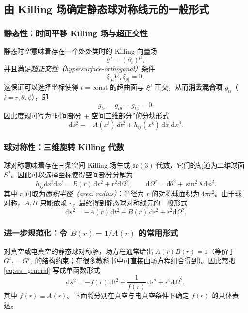 \documentclass[a4paper,12pt]{article}
\begin{document}
\subsection{由 Killing 场确定静态球对称线元的一般形式}

\subsubsection{静态性：时间平移 Killing 场与超正交性}
静态时空意味着存在一个处处类时的 Killing 向量场
\begin{equation}
\xi^\mu = (\partial_t)^\mu,
\end{equation}
并且满足\emph{超正交性（hypersurface-orthogonal）}条件
\begin{equation}
\xi_{[\mu}\nabla_{\nu}\xi_{\rho]}=0,
\end{equation}
这保证可以选择坐标使得 $t=\text{const}$ 的超曲面与 $\xi^\mu$ 正交，从而\textbf{消去混合项} $g_{ti}$（$i=r,\theta,\phi$），即
\begin{equation}
g_{tr}=g_{t\theta}=g_{t\phi}=0.
\end{equation}
因此度规可写为“时间部分 + 空间三维部分”的分块形式
\begin{equation}
\mathrm{d}s^2=-A(x^i)\,dt^2+h_{ij}(x^k)\,\mathrm{d}x^i \mathrm{d}x^j.
\end{equation}

\subsubsection{球对称性：三维旋转 Killing 代数}
球对称意味着存在三条空间 Killing 场生成 $\mathfrak{so}(3)$ 代数，它们的轨道为二维球面 $S^2$。因此可以选择坐标使得空间部分分解为
\begin{equation}
h_{ij}\mathrm{d}x^i \mathrm{d}x^j=B(r)\,\mathrm{d}r^2+r^2 \mathrm{d}\Omega^2,
\qquad
\mathrm{d}\Omega^2=\mathrm{d}\theta^2+\sin^2\theta\,\mathrm{d}\phi^2.
\end{equation}
其中 $r$ 可取为\emph{面积半径（areal radius）}：半径为 $r$ 的对称球面积为 $4\pi r^2$。由于球对称，$A,B$ 只能依赖 $r$，最终得到静态球对称线元的一般形式
\begin{equation}
\boxed{
\mathrm{d}s^2=-A(r)\,\mathrm{d}t^2+B(r)\,\mathrm{d}r^2+r^2 \mathrm{d}\Omega^2.
}
\label{eq:sss_general}
\end{equation}

\subsubsection{进一步规范化：令 $B(r)=1/A(r)$ 的常用形式}
对真空或电真空的静态球对称解，场方程通常给出 $A(r)B(r)=1$（等价于 $G^t{}_t=G^r{}_r$ 的结构约束；在很多教科书中可直接由场方程组合得到）。因此常把 \eqref{eq:sss_general} 写成单函数形式
\begin{equation}
\boxed{
\mathrm{d}s^2=-f(r)\,\mathrm{d}t^2+\frac{1}{f(r)}\,\mathrm{d}r^2+r^2 \mathrm{d}\Omega^2,
}
\label{eq:sss_onefunc}
\end{equation}
其中 $f(r)\equiv A(r)$。下面将分别在真空与电真空条件下确定 $f(r)$ 的具体表达。
\end{document}
